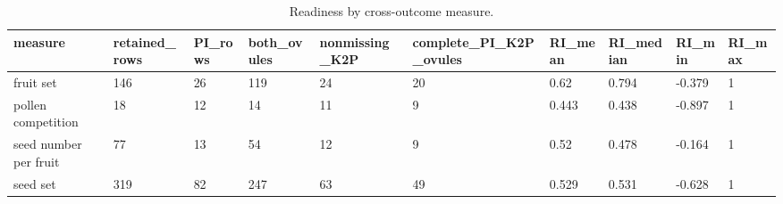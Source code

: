 \begin{table}
\caption{Readiness by cross-outcome measure.}
\label{tab:measure_readiness}
\begin{adjustbox}{max width=\textwidth}
\begin{tabular}{llllllllll}
\toprule
measure & retained\_rows & PI\_rows & both\_ovules & nonmissing\_K2P & complete\_PI\_K2P\_ovules & RI\_mean & RI\_median & RI\_min & RI\_max \\
\midrule
fruit set & 146 & 26 & 119 & 24 & 20 & 0.62 & 0.794 & -0.379 & 1 \\
pollen competition & 18 & 12 & 14 & 11 & 9 & 0.443 & 0.438 & -0.897 & 1 \\
seed number per fruit & 77 & 13 & 54 & 12 & 9 & 0.52 & 0.478 & -0.164 & 1 \\
seed set & 319 & 82 & 247 & 63 & 49 & 0.529 & 0.531 & -0.628 & 1 \\
\bottomrule
\end{tabular}
\end{adjustbox}
\end{table}
